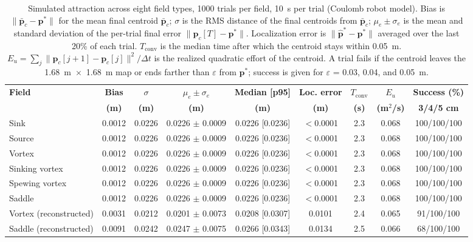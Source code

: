 \begin{table}[!t]
\centering
\footnotesize
\caption{Simulated attraction across eight field types, 1000 trials per field, 10~s per trial (Coulomb robot model). Bias is $\|\bar{\mathbf{p}}_c - \mathbf{p}^*\|$ for the mean final centroid $\bar{\mathbf{p}}_c$; $\sigma$ is the RMS distance of the final centroids from $\bar{\mathbf{p}}_c$; $\mu_e \pm \sigma_e$ is the mean and standard deviation of the per-trial final error $\|\mathbf{p}_c[T] - \mathbf{p}^*\|$. Localization error is $\|\hat{\mathbf{p}}^* - \mathbf{p}^*\|$ averaged over the last 20\% of each trial. $T_{\mathrm{conv}}$ is the median time after which the centroid stays within 0.05~m. $E_u = \sum_j \|\mathbf{p}_c[j+1] - \mathbf{p}_c[j]\|^2/\Delta t$ is the realized quadratic effort of the centroid. A trial fails if the centroid leaves the 1.68~m~$\times$~1.68~m map or ends farther than $\varepsilon$ from $\mathbf{p}^*$; success is given for $\varepsilon$ = 0.03, 0.04, and 0.05~m.}
\label{tab:simulation_estimation_results}
\setlength{\tabcolsep}{4pt}
\begin{tabular}{lcccccccc}
\hline
\textbf{Field} & \textbf{Bias} & \textbf{$\sigma$} & \textbf{$\mu_e \pm \sigma_e$} & \textbf{Median [p95]} & \textbf{Loc. error} & \textbf{$T_{\mathrm{conv}}$} & \textbf{$E_u$} & \textbf{Success (\%)} \\
 & \textbf{(m)} & \textbf{(m)} & \textbf{(m)} & \textbf{(m)} & \textbf{(m)} & \textbf{(s)} & \textbf{(m$^2$/s)} & \textbf{3/4/5 cm} \\
\hline
Sink & 0.0012 & 0.0226 & 0.0226 $\pm$ 0.0009 & 0.0226 [0.0236] & $<$0.0001 & 2.3 & 0.068 & 100/100/100 \\
Source & 0.0012 & 0.0226 & 0.0226 $\pm$ 0.0009 & 0.0226 [0.0236] & $<$0.0001 & 2.3 & 0.068 & 100/100/100 \\
Vortex & 0.0012 & 0.0226 & 0.0226 $\pm$ 0.0009 & 0.0226 [0.0236] & $<$0.0001 & 2.3 & 0.068 & 100/100/100 \\
Sinking vortex & 0.0012 & 0.0226 & 0.0226 $\pm$ 0.0009 & 0.0226 [0.0236] & $<$0.0001 & 2.3 & 0.068 & 100/100/100 \\
Spewing vortex & 0.0012 & 0.0226 & 0.0226 $\pm$ 0.0009 & 0.0226 [0.0236] & $<$0.0001 & 2.3 & 0.068 & 100/100/100 \\
Saddle & 0.0012 & 0.0226 & 0.0226 $\pm$ 0.0009 & 0.0226 [0.0236] & $<$0.0001 & 2.3 & 0.068 & 100/100/100 \\
Vortex (reconstructed) & 0.0031 & 0.0212 & 0.0201 $\pm$ 0.0073 & 0.0208 [0.0307] & 0.0101 & 2.4 & 0.065 & 91/100/100 \\
Saddle (reconstructed) & 0.0091 & 0.0242 & 0.0247 $\pm$ 0.0075 & 0.0266 [0.0343] & 0.0134 & 2.5 & 0.066 & 68/100/100 \\
\hline
\end{tabular}
\end{table}
